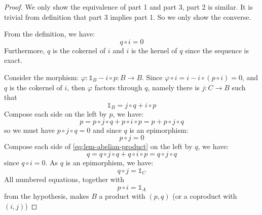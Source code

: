 \documentclass{solution}
\begin{document}
\begin{proof}
    We only show the equivalence of part 1 and part 3, part 2 is similar. It is trivial from definition that part 3 implies part 1. So we only show the converse.

    From the definition, we have:
    \begin{equation}
        q \circ i = 0
    \end{equation}
    Furthermore, $q$ is the cokernel of $i$ and $i$ is the kernel of $q$ since the sequence is exact.

    Consider the morphism: $\varphi: \mathds{1}_B - i \circ p: B \rightarrow B$. Since $\varphi \circ i = i - i \circ (p \circ i) = 0$, and $q$ is the cokernel of $i$, then $\varphi$ factors through $q$, namely there is $j: C \rightarrow B$ such that
    \begin{equation} \label{eq:lem-abelian-product}
        \mathds{1}_B = j \circ q + i \circ p
    \end{equation}
    Compose each side on the left by $p$, we have:
    $$p = p \circ j \circ q + p \circ i \circ p = p + p \circ j \circ q$$
    so we must have $p \circ j \circ q = 0$ and since $q$ is an epimorphism:
    \begin{equation}
        p \circ j = 0
    \end{equation}
    Compose each side of \ref{eq:lem-abelian-product} on the left by $q$, we have:
    $$q = q \circ j \circ q + q \circ i \circ p = q \circ j \circ q$$
    since $q \circ i = 0$. As $q$ is an epimorphism, we have:
    \begin{equation}
        q \circ j = \mathds{1}_C
    \end{equation}
    All numbered equations, together with
    \begin{equation}
        p \circ i = \mathds{1}_A
    \end{equation}
    from the hypothesis, makes $B$ a product with $(p, q)$ (or a coproduct with $(i, j)$)
\end{proof}
\end{document}
